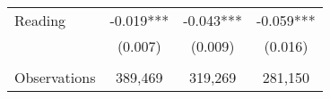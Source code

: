 {\begin{tabular}{lccc}
\hspace{3mm}Reading &      -0.019***&      -0.043***&      -0.059***\\
                    &     (0.007)   &     (0.009)   &     (0.016)   \\
                    &               &               &               \\
\hspace{3mm}Observations&     389,469   &     319,269   &     281,150   \\
 

\bottomrule
\end{tabular}
}
